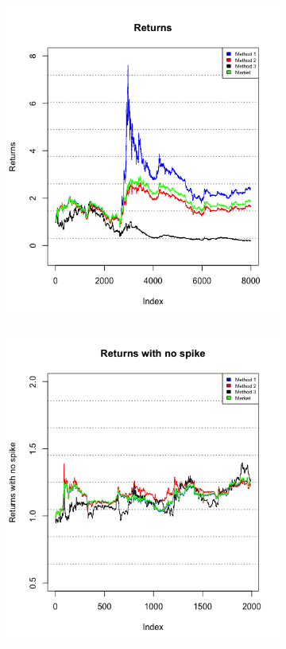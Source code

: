 \documentclass[a4paper,12pt]{article}
\begin{document}
\begin{figure}[h!]
  \centering
  \begin{subfigure}[b]{0.4\linewidth}
    \includegraphics[width=\linewidth]{figures/returns.png}
  \end{subfigure}
  \begin{subfigure}[b]{0.4\linewidth}
    \includegraphics[width=\linewidth]{figures/returns_no_spike.png}

\end{subfigure}
\end{figure}
\end{document}
